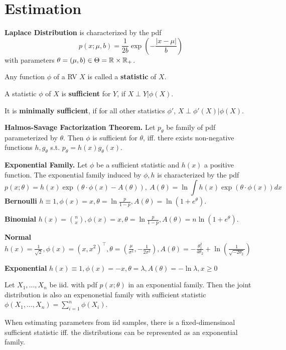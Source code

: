 \vspace*{-3mm}
\section{Estimation}
\textbf{Laplace Distribution} is characterized by the pdf
\[p(x; \mu, b) = \frac{1}{2b}\exp\left(-\frac{|x-\mu|}{b}\right)\]
with parameters \(\theta = (\mu, b) \in \Theta = \mathbb{R} \times \mathbb{R}_+\).

Any function \(\phi\) of a RV \(X\) is called a \textbf{statistic} of \(X\).

A statistic \(\phi\) of \(X\) is \textbf{sufficient} for \(Y\), if \(X \perp Y | \phi(X)\).

It is \textbf{minimally sufficient}, if for all other statistics \(\phi'\), \(X \perp \phi'(X) | \phi(X)\).

\textbf{Halmos-Savage Factorization Theorem.} Let \(p_\theta\) be family of pdf parameterized by \(\theta\). 
Then \(\phi\) is sufficient for \(\theta\), iff. there exists non-negative functions \(h, g_\theta\) s.t.
\(p_\theta = h(x)g_\theta(x)\).

\textbf{Exponential Family.} Let \(\phi\) be a sufficient statistic and \(h(x)\) a positive function. 
The exponential family induced by \(\phi, h\) is characterized by the pdf
\[p(x; \theta) = h(x)\exp(\theta\cdot\phi(x)-A(\theta)), \ A(\theta) = \ln \int h(x) \exp(\theta \cdot \phi(x))dx\]
\textbf{Bernoulli} \(h \equiv 1, \phi(x) = x, \theta = \ln \frac{p}{1-p}, A(\theta) = \ln(1+e^\theta)\).

\textbf{Binomial} \(h(x) = \binom{n}{x}, \phi(x) = x, \theta =  \ln \frac{p}{1-p}, A(\theta) = n \ln(1+e^\theta)\).

\textbf{Normal} \(h(x) = \frac{1}{\sqrt{2}}, \phi(x) = (x, x^2)^\top, \theta = \left(\frac{\mu}{\sigma^2}, -\frac{1}{2\sigma^2}\right), 
A(\theta) = -\frac{\theta_1^2}{4\theta_2} + \ln\left(\frac{1}{\sqrt{-2\theta_2}}\right)\)  


\textbf{Exponential} \(h(x) \equiv 1, \phi(x) = -x, \theta = \lambda, A(\theta) = - \ln \lambda, x \geq 0\)

Let \(X_1, ..., X_n\) be iid. with pdf \(p(x; \theta)\) in an exponential family. 
Then the joint distribution is also an expenonetial family 
with sufficient statistic \(\phi(X_1, ..., X_n) = \sum_{i = 1}^n \phi(X_i)\).

When estimating parameters from iid samples, there is a fixed-dimensinoal sufficient statistic 
iff. the distributions can be represented as an exponential family.

